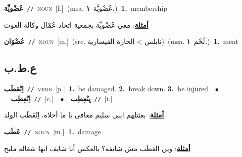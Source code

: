 \documentclass[10pt,a4paper,twoside]{article} %
\begin{document}
\begin{multicols}{2}
{\setlength\topsep{0pt}\textbf{\foreignlanguage{arabic}{عُضْويِّة}}\ {\color{gray}\texttt{//}\color{black}}\ \textsc{noun}\ [f.]\ \color{gray}(msa. \foreignlanguage{arabic}{عُضْويَّة}~\foreignlanguage{arabic}{\textbf{١.}})\color{black}\ \textbf{1.}~membership\  \begin{flushright}\color{gray}\foreignlanguage{arabic}{\textbf{\underline{\foreignlanguage{arabic}{أمثلة}}}: معي عُضْويِّة بجمعية اتحاد عُمّال وكالة الغوث}\end{flushright}\color{black}} \vspace{2mm}

{\setlength\topsep{0pt}\textbf{\foreignlanguage{arabic}{عُضْوَان}}\ {\color{gray}\texttt{//}\color{black}}\ \textsc{noun}\ [m.]\ (src. \color{gray}\foreignlanguage{arabic}{نابلس > الحارة القيسارية}\color{black})\ \color{gray}(msa. \foreignlanguage{arabic}{لَحْم}~\foreignlanguage{arabic}{\textbf{١.}})\color{black}\ \textbf{1.}~meat\ } \vspace{2mm}

\vspace{-3mm}
\subsection*{\color{blue}\foreignlanguage{arabic}{ع.ط.ب}\color{blue}{}} 

{\setlength\topsep{0pt}\textbf{\foreignlanguage{arabic}{اِنْعَطَب}}\ {\color{gray}\texttt{//}\color{black}}\ \textsc{verb}\ [p.]\ \textbf{1.}~be damaged.  \textbf{2.}~break down.  \textbf{3.}~be injured\ \ $\bullet$\ \ \setlength\topsep{0pt}\textbf{\foreignlanguage{arabic}{اِنْعِطِب}}\ {\color{gray}\texttt{//}\color{black}}\ [c.]\ \ $\bullet$\ \ \setlength\topsep{0pt}\textbf{\foreignlanguage{arabic}{يِنْعِطِب}}\ {\color{gray}\texttt{//}\color{black}}\ [i.]\  \begin{flushright}\color{gray}\foreignlanguage{arabic}{\textbf{\underline{\foreignlanguage{arabic}{أمثلة}}}: بعثتلهم ابني سليم معافى يا ما أحلاه، اِنْعَطَب الولد}\end{flushright}\color{black}} \vspace{2mm}

{\setlength\topsep{0pt}\textbf{\foreignlanguage{arabic}{عَطَب}}\ {\color{gray}\texttt{//}\color{black}}\ \textsc{noun}\ [m.]\ \textbf{1.}~damage\  \begin{flushright}\color{gray}\foreignlanguage{arabic}{\textbf{\underline{\foreignlanguage{arabic}{أمثلة}}}: وين العَطَب مش شايفه؟ بالعكس أنا شايف انها شغالة مليح}\end{flushright}\color{black}} \vspace{2mm}


\end{multicols}
\end{document}
